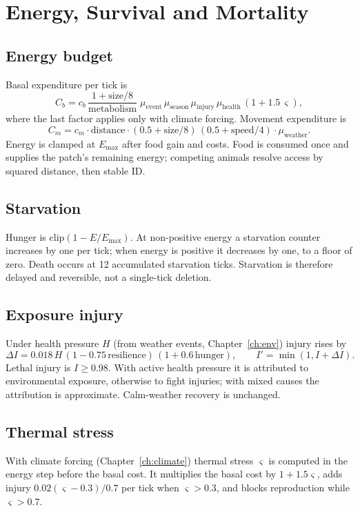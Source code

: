 \chapter{Energy, Survival and Mortality}

\section{Energy budget}
Basal expenditure per tick is
\[
C_b=c_b\,\frac{1+\text{size}/8}{\text{metabolism}}\;
\mu_{\text{event}}\,\mu_{\text{season}}\,\mu_{\text{injury}}\,\mu_{\text{health}}\,(1+1.5\,\varsigma),
\]
where the last factor applies only with climate forcing. Movement expenditure is
\[
C_m=c_m\cdot\text{distance}\cdot(0.5+\text{size}/8)\,(0.5+\text{speed}/4)\cdot\mu_{\text{weather}}.
\]
Energy is clamped at $E_{\max}$ after food gain and costs. Food is consumed once
and supplies the patch's remaining energy; competing animals resolve access by
squared distance, then stable ID.

\section{Starvation}
Hunger is $\mathrm{clip}(1-E/E_{\max})$. At non-positive energy a starvation
counter increases by one per tick; when energy is positive it decreases by one, to
a floor of zero. Death occurs at 12 accumulated starvation ticks. Starvation is
therefore delayed and reversible, not a single-tick deletion.

\section{Exposure injury}
Under health pressure $H$ (from weather events, Chapter~\ref{ch:env}) injury rises
by
\[
\Delta I=0.018\,H\,(1-0.75\,\text{resilience})\,(1+0.6\,\text{hunger}),\qquad I'=\min(1,I+\Delta I).
\]
Lethal injury is $I\ge0.98$. With active health pressure it is attributed to
environmental exposure, otherwise to fight injuries; with mixed causes the
attribution is approximate. Calm-weather recovery is unchanged.

\section{Thermal stress}
With climate forcing (Chapter~\ref{ch:climate}) thermal stress $\varsigma$ is
computed in the energy step before the basal cost. It multiplies the basal cost by
$1+1.5\varsigma$, adds injury $0.02(\varsigma-0.3)/0.7$ per tick when
$\varsigma>0.3$, and blocks reproduction while $\varsigma>0.7$.

